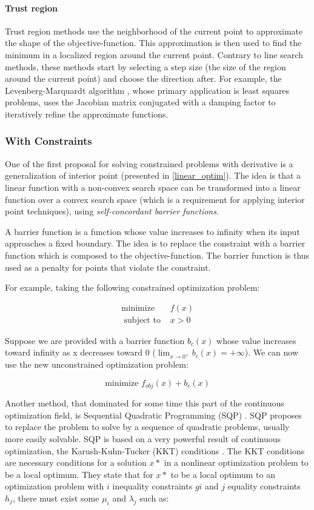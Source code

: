 \paragraph{Trust region}

Trust region methods use the neighborhood of the current point to approximate the shape of the objective-function. This approximation is then used to find the minimum in a localized region around the current point. Contrary to line search methods, these methods start by selecting a step size (the size of the region around the current point) and choose the direction after.
For example, the Levenberg-Marquardt algorithm \cite{levenberg44,marquardt63}, whose primary application is least squares problems, uses the Jacobian matrix conjugated with a damping factor to iteratively refine the approximate functions.

\subsubsection{With Constraints}

One of the first proposal for solving constrained problems with derivative is a generalization of interior point (presented in \ref{linear_optim}). The idea is that a linear function with a non-convex search space can be transformed into a linear function over a convex search space (which is a requirement for applying interior point techniques), using \emph{self-concordant barrier functions}.

A barrier function is a function whose value increases to infinity when its input approaches a fixed boundary.
The idea is to replace the constraint with a barrier function which is composed to the objective-function. The barrier function is thus used as a penalty for points that violate the constraint.

For example, taking the following constrained optimization problem:

\begin{align*}
\text{minimize } &f(x)\\
\text{ subject to } &x > 0
\end{align*}

Suppose we are provided with a barrier function $b_c(x)$ whose value increases toward infinity as x decreases toward 0 ($\lim_{x \to 0^+}b_c(x) = +\infty$). We can now use the new unconstrained optimization problem:	

$$\text{minimize } f_{obj}(x) + b_c(x)$$

Another method, that dominated for some time this part of the continuous optimization field, is Sequential Quadratic Programming (SQP) \cite{boggs1995sequential}. SQP proposes to replace the problem to solve by a sequence of quadratic problems, usually more easily solvable.
SQP is based on a very powerful result of continuous optimization, the Karush-Kuhn-Tucker (KKT) conditions \cite{kuhn1951nonlinear}. The KKT conditions are necessary conditions for a solution $x*$ in a nonlinear optimization problem to be a local optimum. They state that for $x*$ to be a local optimum to an optimization problem with $i$ inequality constraints $gi$ and $j$ equality constraints $h_j$, there must exist some $\mu_i$ and $\lambda_j$ such as:

